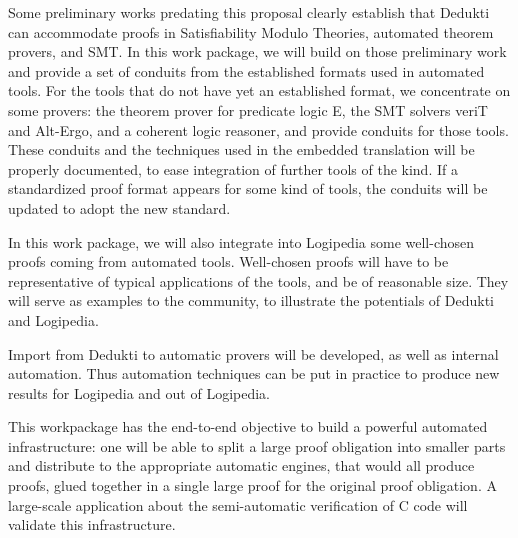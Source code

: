 \begin{workpackage}
\begin{wpdescription}
Some preliminary works predating this proposal clearly establish that
Dedukti can accommodate proofs in Satisfiability Modulo Theories,
automated theorem provers, and SMT. In this work package, we will build
on those preliminary work and provide a set of conduits from the
established formats used in automated tools. For the tools that do not
have yet an established format, we concentrate on some provers: the
theorem prover for predicate logic E, the SMT solvers veriT and Alt-Ergo, and a
coherent logic reasoner, and provide conduits for those tools. These
conduits and the techniques used in the embedded translation will be
properly documented, to ease integration of further tools of the kind.
If a standardized proof format appears for some kind of tools, the
conduits will be updated to adopt the new standard.

In this work package, we will also integrate into Logipedia some well-chosen
proofs coming from automated tools.  Well-chosen proofs will have to be
representative of typical applications of the tools, and be of reasonable size.
They will serve as examples to the community, to illustrate the potentials of
Dedukti and Logipedia.

Import from Dedukti to automatic provers will be developed, as well as
internal automation. Thus automation techniques can be put in practice to
produce new results for Logipedia and out of Logipedia.

This workpackage has the end-to-end objective to build a powerful automated
infrastructure: one will be able to split a large proof obligation into smaller
parts and distribute to the appropriate automatic engines, that would all
produce proofs, glued together in a single large proof for the original proof
obligation. A large-scale application about the semi-automatic verification of C
code will validate this infrastructure.
\end{wpdescription}


\begin{tasklist}
  \begin{task}[id=instrumenting,
      title=Instrumenting ATPs to produce traces,
      lead=Lie,
      LieRM=28,
      ImtRM=1,
      OcaRM=12,
      BelRM=6,
      wphases=1-48!1.0
    ]


\end{task}
\end{tasklist}
\end{workpackage}
